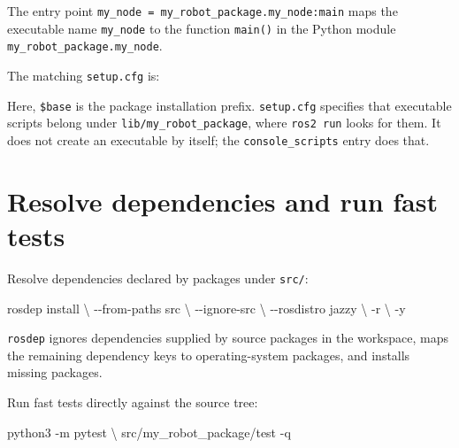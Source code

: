 \documentclass[
  australian,
  12pt,
  letterpaper,
  DIV=11,
  numbers=noendperiod,
  twoside]{scrreprt}
\newenvironment{Shaded}{\begin{snugshade}}{\end{snugshade}}
\newcommand{\AttributeTok}[1]{\textcolor[rgb]{0.40,0.45,0.13}{#1}}
\newcommand{\DataTypeTok}[1]{\textcolor[rgb]{0.68,0.00,0.00}{#1}}
\newcommand{\ExtensionTok}[1]{\textcolor[rgb]{0.00,0.23,0.31}{#1}}
\newcommand{\KeywordTok}[1]{\textcolor[rgb]{0.00,0.23,0.31}{\textbf{#1}}}
\newcommand{\NormalTok}[1]{\textcolor[rgb]{0.00,0.23,0.31}{#1}}
\newcommand{\OtherTok}[1]{\textcolor[rgb]{0.00,0.23,0.31}{#1}}
\newcommand{\StringTok}[1]{\textcolor[rgb]{0.13,0.47,0.30}{#1}}
\begin{document}
The entry point \texttt{my\_node\ =\ my\_robot\_package.my\_node:main}
maps the executable name \texttt{my\_node} to the function
\texttt{main()} in the Python module
\texttt{my\_robot\_package.my\_node}.

The matching \texttt{setup.cfg} is:

\begin{Shaded}
\end{Shaded}

Here, \texttt{\$base} is the package installation prefix.
\texttt{setup.cfg} specifies that executable scripts belong under
\texttt{lib/my\_robot\_package}, where \texttt{ros2\ run} looks for
them. It does not create an executable by itself; the
\texttt{console\_scripts} entry does that.

\section{Resolve dependencies and run fast
tests}\label{resolve-dependencies-and-run-fast-tests}

Resolve dependencies declared by packages under \texttt{src/}:

\begin{Shaded}
\begin{Highlighting}[]
\ExtensionTok{rosdep}\NormalTok{ install }\DataTypeTok{\textbackslash{}}
  \AttributeTok{{-}{-}from{-}paths}\NormalTok{ src }\DataTypeTok{\textbackslash{}}
  \AttributeTok{{-}{-}ignore{-}src} \DataTypeTok{\textbackslash{}}
  \AttributeTok{{-}{-}rosdistro}\NormalTok{ jazzy }\DataTypeTok{\textbackslash{}}
  \AttributeTok{{-}r} \DataTypeTok{\textbackslash{}}
  \AttributeTok{{-}y}
\end{Highlighting}
\end{Shaded}

\texttt{rosdep} ignores dependencies supplied by source packages in the
workspace, maps the remaining dependency keys to operating-system
packages, and installs missing packages.

Run fast tests directly against the source tree:

\begin{Shaded}
\begin{Highlighting}[]
\ExtensionTok{python3} \AttributeTok{{-}m}\NormalTok{ pytest }\DataTypeTok{\textbackslash{}}
\NormalTok{  src/my\_robot\_package/test }\AttributeTok{{-}q}
\end{Highlighting}
\end{Shaded}
\end{document}
